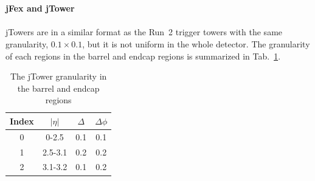 \\
\\{\bf jFex and jTower}
\\
\\jTowers are in a similar format as the Run~2 trigger towers with the same granularity, $0.1\times0.1$, but it is not uniform in the whole detector. The granularity of each regions in the barrel and endcap regions is summarized in Tab.~\ref{Tab:granularity_jT}.
\begin{table}[h]
	\caption{The jTower granularity in the barrel and endcap regions}
	\renewcommand{\arraystretch}{1.3}
	\centering
	\begin{tabular}{| c | c | c | c | }
		\hline
		\hline
		Index      &    $|\eta|$        &     $\Delta$     & $\Delta\phi$   \\
		\hline
		0          &     0-2.5          & 0.1                          &  0.1                          \\
		\hline
		1          &     2.5-3.1           & 0.2                          &  0.2                         \\
		\hline
		2      &     3.1-3.2       & 0.1                       &  0.2                       \\
		\hline
		\hline
	\end{tabular}
	\label{Tab:granularity_jT}
\end{table}

